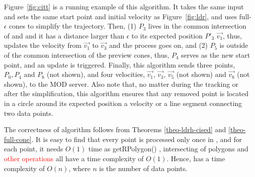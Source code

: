 \begin{example}
	Figure~\ref{fig:citt} is a running example of this algorithm. It takes the same input and sets the same start point and initial velocity as Figure~\ref{fig:ldr}, and uses full-$\epsilon$ cones to simplify the trajectory. Then, (1) $P_3$ lives in the common intersection of  and  and it has a distance larger than $\epsilon$ to its expected position $P'_3$ \wrt $\vec{v_1}$, thus, \citt updates the velocity from $\vec{v_1}$ to $\vec{v_3}$ and the process goes on, and (2) $P_5$ is outside of the common intersection of the preview cones, thus, $P_4$ serves as the new start point, and an update is triggered. Finally, this algorithm sends three points, $P_0, P_4$ and $P_8$ (not shown), and four velocities, $\vec{v_1}$, $\vec{v_3}$, $\vec{v_5}$ (not shown) and $\vec{v_8}$ (not shown), to the MOD server. Also note that, no matter during the tracking or after the simplification, this algorithm ensures that any removed point is located in a circle around its expected position \wrt a velocity or a line segment connecting two data points. 
\end{example}


The correctness of algorithm \citt follows from Theorems \ref{theo-ldrh-cised} and \ref{theo-full-cone}.
It is easy to find that every point is processed only once in \citt, and for each point, it needs $O(1)$ time as getRPolygon() \cite{Lin:Cised}, intersecting of polygons \cite{Lin:Cised} and \textcolor{red}{other operations} all have a time complexity of $O(1)$. Hence, \citt has a time complexity of $O(n)$, where $n$ is the number of data points.






